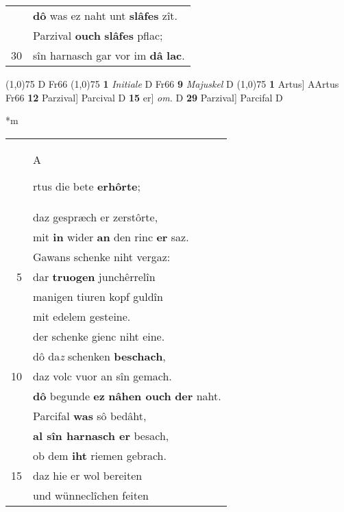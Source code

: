 \documentclass[8pt,a4paper,notitlepage]{article}
\begin{document}
\begin{table}[ht]
\begin{minipage}[t]{0.5\linewidth}
\begin{tabular}{rl}
 & \textbf{dô} was ez naht unt \textbf{slâfes} zît.\\ 
 & Parzival \textbf{ouch} \textbf{slâfes} pflac;\\ 
30 & sîn harnasch gar vor im \textbf{dâ} \textbf{lac}.\\ 
\end{tabular}
\scriptsize
\line(1,0){75} \newline
D Fr66 \newline
\line(1,0){75} \newline
\textbf{1} \textit{Initiale} D Fr66  \textbf{9} \textit{Majuskel} D  \newline
\line(1,0){75} \newline
\textbf{1} Artus] AArtus Fr66 \textbf{12} Parzival] Parcival D \textbf{15} er] \textit{om.} D \textbf{29} Parzival] Parcifal D \newline
\end{minipage}
\hspace{0.5cm}
\begin{minipage}[t]{0.5\linewidth}
\small
\begin{center}*m
\end{center}
\begin{tabular}{rl}
 & \begin{large}A\end{large}rtus die bete \textbf{erhôrte};\\ 
 & daz gespræch er zerstôrte,\\ 
 & mit \textbf{in} wider \textbf{an} den rinc \textbf{er} saz.\\ 
 & Gawans schenke niht vergaz:\\ 
5 & dar \textbf{truogen} junchêrrelîn\\ 
 & manigen tiuren kopf guldîn\\ 
 & mit edelem gesteine.\\ 
 & der schenke gienc niht eine.\\ 
 & dô da\textit{z} schenken \textbf{beschach},\\ 
10 & daz volc vuor an sîn gemach.\\ 
 & \textbf{dô} begunde \textbf{ez} \textbf{nâhen ouch} \textbf{der} naht.\\ 
 & Parcifal \textbf{was} sô bedâht,\\ 
 & \textbf{al sîn harnasch er} besach,\\ 
 & ob dem \textbf{iht} riemen gebrach.\\ 
15 & daz hie er wol bereiten\\ 
 & und wünneclîchen feiten\\ 

\end{tabular}
\end{minipage}
\end{table}
\end{document}
